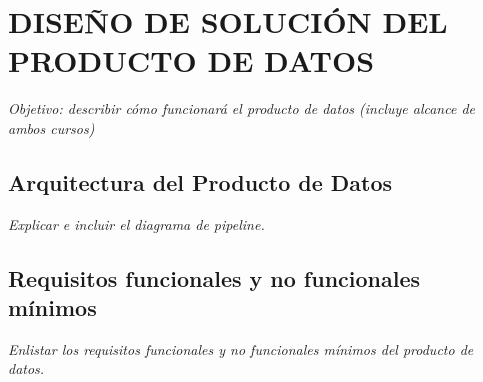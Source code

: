 \chapter{DISEÑO DE SOLUCIÓN DEL PRODUCTO DE DATOS}

\noindent \textit{Objetivo: describir cómo funcionará el producto de datos (incluye alcance de ambos cursos)}

\section{Arquitectura del Producto de Datos}
\noindent \textit{Explicar e incluir el diagrama de pipeline.}
\section{Requisitos funcionales y no funcionales mínimos}
\noindent \textit{Enlistar los requisitos funcionales y no funcionales mínimos del producto de datos.}



